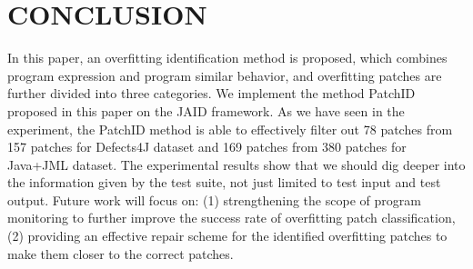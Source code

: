 \documentclass[sn-basic]{sn-jnl}
\theoremstyle{thmstyleone}
\theoremstyle{thmstyletwo}
\theoremstyle{thmstylethree}
\begin{document}
\section{CONCLUSION}\label{sec6}
In this paper, an overfitting identification method is proposed, which combines program expression and program similar behavior, and overfitting patches are further divided into three categories. We implement the method PatchID proposed in this paper on the JAID framework. As we have seen in the experiment, the PatchID method is able to effectively filter out 78 patches from 157 patches for Defects4J dataset and 169 patches from 380 patches for Java+JML dataset. The experimental results show that we should dig deeper into the information given by the test suite, not just limited to test input and test output. Future work will focus on: (1) strengthening the scope of program monitoring to further improve the success rate of overfitting patch classification, (2) providing an effective repair scheme for the identified overfitting patches to make them closer to the correct patches.
\nocite{*}
%
%

\end{document}

